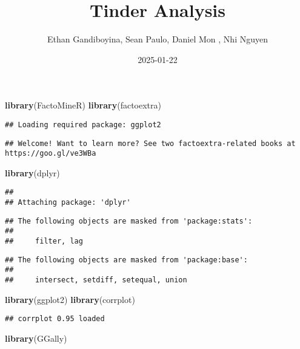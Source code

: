 \documentclass[
]{article}
\title{Tinder Analysis}
\author{Ethan Gandiboyina, Sean Paulo, Daniel Mon , Nhi Nguyen}
\date{2025-01-22}
\newenvironment{Shaded}{\begin{snugshade}}{\end{snugshade}}
\newcommand{\FunctionTok}[1]{\textcolor[rgb]{0.13,0.29,0.53}{\textbf{#1}}}
\newcommand{\NormalTok}[1]{#1}
\begin{document}
\maketitle

\begin{Shaded}
\begin{Highlighting}[]
\FunctionTok{library}\NormalTok{(FactoMineR)}
\FunctionTok{library}\NormalTok{(factoextra)}
\end{Highlighting}
\end{Shaded}

\begin{verbatim}
## Loading required package: ggplot2
\end{verbatim}

\begin{verbatim}
## Welcome! Want to learn more? See two factoextra-related books at https://goo.gl/ve3WBa
\end{verbatim}

\begin{Shaded}
\begin{Highlighting}[]
\FunctionTok{library}\NormalTok{(dplyr)}
\end{Highlighting}
\end{Shaded}

\begin{verbatim}
## 
## Attaching package: 'dplyr'
\end{verbatim}

\begin{verbatim}
## The following objects are masked from 'package:stats':
## 
##     filter, lag
\end{verbatim}

\begin{verbatim}
## The following objects are masked from 'package:base':
## 
##     intersect, setdiff, setequal, union
\end{verbatim}

\begin{Shaded}
\begin{Highlighting}[]
\FunctionTok{library}\NormalTok{(ggplot2)}
\FunctionTok{library}\NormalTok{(corrplot)}
\end{Highlighting}
\end{Shaded}

\begin{verbatim}
## corrplot 0.95 loaded
\end{verbatim}

\begin{Shaded}
\begin{Highlighting}[]
\FunctionTok{library}\NormalTok{(GGally)}
\end{Highlighting}
\end{Shaded}
\end{document}
